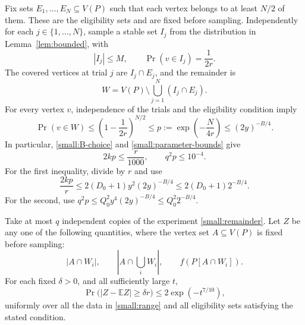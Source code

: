 Fix sets $E_1,\ldots,E_N\subseteq V(P)$ such that each vertex belongs
to at least $N/2$ of them. These are the eligibility sets and are fixed
before sampling. Independently for each $j\in\{1,\ldots,N\}$, sample a
stable set $I_j$ from the distribution in Lemma~\ref{lem:bounded}, with
\[
 |I_j|\le M,\qquad \Pr(v\in I_j)=\frac1{2r}.
\]
The covered vertices at trial $j$ are $I_j\cap E_j$, and the remainder is
\begin{equation}\label{small:remainder}
 W=V(P)\setminus\bigcup_{j=1}^N(I_j\cap E_j).
\end{equation}
For every vertex $v$, independence of the trials and the eligibility
condition imply
\begin{equation}\label{small:survival}
 \Pr(v\in W)
 \le\left(1-\frac1{2r}\right)^{N/2}
 \le p:=\exp\left(-\frac{N}{4r}\right)
 \le(2y)^{-B/4}.
\end{equation}
In particular, \eqref{small:B-choice} and \eqref{small:parameter-bounds}
give
\begin{equation}\label{small:sparseness}
 2kp\le\frac r{1000},\qquad q^2p\le10^{-4}.
\end{equation}
For the first inequality, divide by $r$ and use
\[
 \frac{2kp}{r}
 \le2(D_0+1)y^2(2y)^{-B/4}
 \le2(D_0+1)2^{-B/4}.
\]
For the second, use
$q^2p\le Q_0^2y^4(2y)^{-B/4}\le Q_0^2 2^{-B/4}$.

\begin{lemma}\label{small:concentration}
Take at most $q$ independent copies of the experiment
\eqref{small:remainder}. Let $Z$ be any one of the following quantities,
where the vertex set $A\subseteq V(P)$ is fixed before sampling:
\[
 |A\cap W_i|,\qquad
 \left|A\cap\bigcup_iW_i\right|,\qquad
 f(P[A\cap W_i]).
\]
For each fixed $\delta>0$, and all sufficiently large $t$,
\begin{equation}\label{small:uniform-tail}
 \Pr\bigl(|Z-\mathbb EZ|\ge\delta r\bigr)
 \le2\exp(-t^{7/10}),
\end{equation}
uniformly over all the data in \eqref{small:range} and all eligibility
sets satisfying the stated condition.
\end{lemma}

